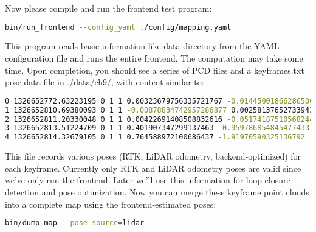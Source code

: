 Now please compile and run the frontend test program:
\begin{lstlisting}[language=sh,caption=Terminal command:]
bin/run_frontend --config_yaml ./config/mapping.yaml
\end{lstlisting}

This program reads basic information like data directory from the YAML configuration file and runs the entire frontend. The computation may take some time. Upon completion, you should see a series of PCD files and a keyframes.txt pose data file in ./data/ch9/, with content similar to:

\begin{lstlisting}[language=sh,caption=keyframes.txt]
0 1326652772.63223195 0 1 1 0.00323679756335721767 -0.0144500186628650669 0.00648581949310997503 0.00102604343126653629 -0.000610794694837971455 -0.00292974916442335183 0.999994995354752558 0 0 0 0 0 0 1 0 0 0 0 0 0 1 0 0 0 0 0 0 1 
1 1326652810.69380093 0 1 1 -0.00878834742957286877 0.00258137652733943018 -0.0370536530158143834 0.00556325961406906912 -0.000227692342581170451 0.0937748334061895006 0.995577861806049347 -0.00207286058563104208 0.00403151070086457675 0.00941915643412104611 0 0 0 1 0 0 0 0 0 0 1 0 0 0 0 0 0 1 
2 1326652811.20330048 0 1 1 0.00422691408508832616 -0.0517418751056824486 -0.0160935510000861509 0.0231508342749745313 -0.00193957036575541104 0.191042271176856737 0.981306846792967979 -0.00323174750160585156 0.0129979040447824497 0.0161721026594033174 0 0 0 1 0 0 0 0 0 0 1 0 0 0 0 0 0 1 
3 1326652813.51224709 0 1 1 0.401907347299137463 -0.959786854845477433 -0.0772027821235120038 0.108749752190681712 0.0143241272304329356 0.187688702845765748 0.976084659034054059 -0.0201519057154655457 0.305439419113099575 0.0159999999999627107 0 0 0 1 0 0 0 0 0 0 1 0 0 0 0 0 0 1 
4 1326652814.32679105 0 1 1 0.764588972100686437 -1.91970590325136792 -0.0977756250833726193 0.0454533237407165613 -0.0122335876446319734 0.187788495604154393 0.981080942436958869 -0.268586141930427402 0.693511614575982205 0.0269999999999868123 0 0 0 1 0 0 0 0 0 0 1 0 0 0 0 0 0 1 
\end{lstlisting}

This file records various poses (RTK, LiDAR odometry, backend-optimized) for each keyframe. Currently only RTK and LiDAR odometry poses are valid since we've only run the frontend. Later we'll use this information for loop closure detection and pose optimization. Now you can merge these keyframe point clouds into a complete map using the frontend-estimated poses:
\begin{lstlisting}[language=sh,caption=Terminal command:]
bin/dump_map --pose_source=lidar
\end{lstlisting}


